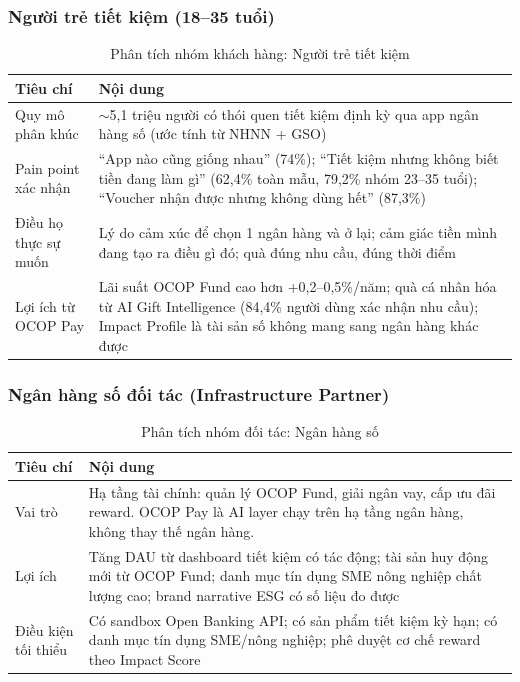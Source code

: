 \documentclass[13pt,a4paper]{extarticle}
\begin{document}
\subsubsection{Người trẻ tiết kiệm (18--35 tuổi)}

\begin{table}[H]
\centering
\caption{Phân tích nhóm khách hàng: Người trẻ tiết kiệm}
\begin{tabular}{|p{4cm}|p{10cm}|}
\hline
\textbf{Tiêu chí} & \textbf{Nội dung} \\
\hline
Quy mô phân khúc & $\sim$5,1 triệu người có thói quen tiết kiệm định kỳ qua app ngân hàng số (ước tính từ NHNN + GSO) \\
\hline
Pain point xác nhận & ``App nào cũng giống nhau'' (74\%); ``Tiết kiệm nhưng không biết tiền đang làm gì'' (62,4\% toàn mẫu, 79,2\% nhóm 23--35 tuổi); ``Voucher nhận được nhưng không dùng hết'' (87,3\%) \\
\hline
Điều họ thực sự muốn & Lý do cảm xúc để chọn 1 ngân hàng và ở lại; cảm giác tiền mình đang tạo ra điều gì đó; quà đúng nhu cầu, đúng thời điểm \\
\hline
Lợi ích từ OCOP Pay & Lãi suất OCOP Fund cao hơn +0,2--0,5\%/năm; quà cá nhân hóa từ AI Gift Intelligence (84,4\% người dùng xác nhận nhu cầu); Impact Profile là tài sản số không mang sang ngân hàng khác được \\
\hline
\end{tabular}
\end{table}

\subsubsection{Ngân hàng số đối tác (Infrastructure Partner)}

\begin{table}[H]
\centering
\caption{Phân tích nhóm đối tác: Ngân hàng số}
\begin{tabular}{|p{4cm}|p{10cm}|}
\hline
\textbf{Tiêu chí} & \textbf{Nội dung} \\
\hline
Vai trò & Hạ tầng tài chính: quản lý OCOP Fund, giải ngân vay, cấp ưu đãi reward. OCOP Pay là AI layer chạy trên hạ tầng ngân hàng, không thay thế ngân hàng. \\
\hline
Lợi ích & Tăng DAU từ dashboard tiết kiệm có tác động; tài sản huy động mới từ OCOP Fund; danh mục tín dụng SME nông nghiệp chất lượng cao; brand narrative ESG có số liệu đo được \\
\hline
Điều kiện tối thiểu & Có sandbox Open Banking API; có sản phẩm tiết kiệm kỳ hạn; có danh mục tín dụng SME/nông nghiệp; phê duyệt cơ chế reward theo Impact Score \\
\hline
\end{tabular}
\end{table}
\end{document}
